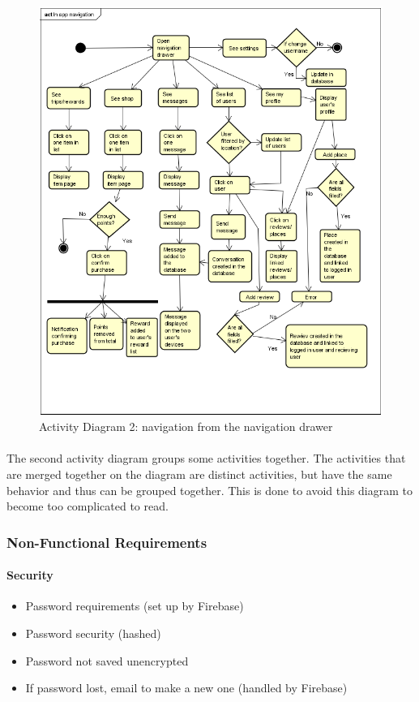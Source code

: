 \documentclass[paper=a4, fontsize=12pt,DIV=14]{scrartcl}    %
\begin{document}
		                \begin{figure}[!htbp]
		                    \center
		                    \includegraphics[scale=1]{img/act_navigation.png}
		                    \caption{Activity Diagram 2: navigation from the navigation drawer}
		                \end{figure}

		                \paragraph{}The second activity diagram groups some activities together. The activities that are merged together on the diagram are distinct activities, but have the same behavior and thus can be grouped together. This is done to avoid this diagram to become too complicated to read.

        		\subsubsection{Non-Functional Requirements}
        			\paragraph{Security}
        			\begin{itemize}
        				\item Password requirements (set up by Firebase)
        				\item Password security (hashed)
        				\item Password not saved unencrypted
        				\item If password lost, email to make a new one (handled by Firebase)
        			\end{itemize}
\end{document}
